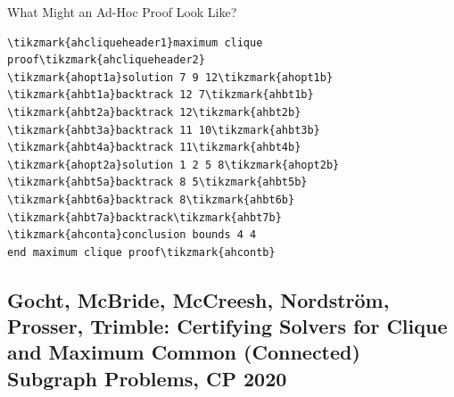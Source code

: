 \documentclass[aspectratio=169,compress,10pt]{beamer}
\begin{document}
\begin{frame}[fragile,t]{What Might an Ad-Hoc Proof Look Like?}
\vspace*{-0.5cm}
\begin{minipage}{0.35\textwidth}
\begin{Verbatim}[commandchars=\\\{\},codes={\catcode`$=3\catcode`^=7}]
\tikzmark{ahcliqueheader1}maximum clique proof\tikzmark{ahcliqueheader2}
\tikzmark{ahopt1a}solution 7 9 12\tikzmark{ahopt1b}
\tikzmark{ahbt1a}backtrack 12 7\tikzmark{ahbt1b}
\tikzmark{ahbt2a}backtrack 12\tikzmark{ahbt2b}
\tikzmark{ahbt3a}backtrack 11 10\tikzmark{ahbt3b}
\tikzmark{ahbt4a}backtrack 11\tikzmark{ahbt4b}
\tikzmark{ahopt2a}solution 1 2 5 8\tikzmark{ahopt2b}
\tikzmark{ahbt5a}backtrack 8 5\tikzmark{ahbt5b}
\tikzmark{ahbt6a}backtrack 8\tikzmark{ahbt6b}
\tikzmark{ahbt7a}backtrack\tikzmark{ahbt7b}
\tikzmark{ahconta}conclusion bounds 4 4
end maximum clique proof\tikzmark{ahcontb}
\end{Verbatim}
\end{minipage}
\end{frame}

\subsection{Gocht, McBride, McCreesh, Nordstr\"om, Prosser, Trimble: Certifying Solvers for Clique and Maximum Common (Connected) Subgraph Problems, CP 2020}
\end{document}
